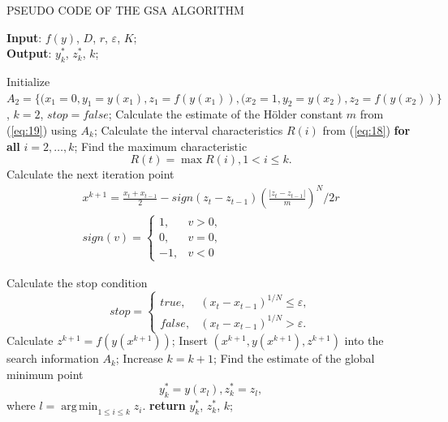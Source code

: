 \documentclass[review]{elsarticle}
\DeclareMathOperator*{\argmin}{arg\,min}
\begin{document}
\begin{algorithm}[]
\caption{PSEUDO CODE OF THE GSA ALGORITHM} \label{alg:1}
\scriptsize
\hspace*{\algorithmicindent} \textbf{Input}: $f(y)$, $D$, $r$, $\varepsilon$, $K$;\\
\hspace*{\algorithmicindent} \textbf{Output}: $y_k^*$, $z_k^*$, $k$;
\begin{algorithmic}[1]
\State Initialize $A_2=\{(x_1=0,y_1=y(x_1 ),z_1=f(y(x_1 )),(x_2=1,y_2=y(x_2 ),z_2=f(y(x_2 ))\}$, $k = 2$, $stop = false$;
  \State Calculate the estimate of the H\"older constant $m$ from (\ref{eq:19}) using $A_k$;
  \State Calculate the interval characteristics $R(i)$ from (\ref{eq:18}) \textbf{for all} $i = 2, \dots, k$;
	\State Find the maximum characteristic 
	\begin{equation}\label{eq:20}
		R(t)=\max{R(i)}, 1 < i \leq k.
  \end{equation}
	\State Calculate the next iteration point
	\begin{equation}\label{eq:21}
	\begin{matrix}
	   x^{k+1}=\frac{x_t+x_{t-1}}{2}-sign(z_t-z_{t-1})(\frac{|z_t-z_{t-1}|}{m})^N/2r \\
		 sign(v)=\begin{cases}
		            1, &v>0,\\
		            0, &v=0,\\
								-1,&v<0
							\end{cases}
	\end{matrix}
	\end{equation}
	
	\State Calculate the stop condition
	\begin{equation}\label{eq:22}
     stop = \begin{cases} true, &(x_t - x_{t-1})^{1/N} \leq \varepsilon,\\
		                      false,&(x_t - x_{t-1})^{1/N} > \varepsilon.
							\end{cases}		
  \end{equation}
	  \State Calculate $z^{k+1} = f( y(x^{k+1}))$;
    \State Insert $(x^{k+1}, y(x^{k+1}), z^{k+1})$ into the search information $A_k$;
    \State Increase $k = k + 1$;
  \EndIf
\EndWhile
\State Find the estimate of the global minimum point
\begin{equation}\label{eq:23}
y_k^*= y(x_l),  z_k^*=z_l,
\end{equation}
where $l= \argmin_{1 \leq i \leq k}z_i$.
\State \textbf{return} $y_k^*$, $z_k^*$, $k$;
\end{algorithmic}
\end{algorithm}
\end{document}
